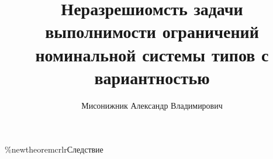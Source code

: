 
\title{Неразрешиомсть задачи выполнимости ограничений номинальной системы типов с вариантностью}

\author{Мисонижник Александр Владимирович}





\theoremstyle{plain}
\%newtheorem{crlr}{Следствие}%

\theoremstyle{definition}
\newtheorem*{proof*}{Доказательство}

\renewcommand{\defnautorefname}{Definition}
\renewcommand{\lemautorefname}{Lemma}
\renewcommand{\remkautorefname}{Remark}
\renewcommand{\propautorefname}{Proposition}
\renewcommand{\exmpautorefname}{Example}
\renewcommand{\thmautorefname}{Theorem}
\newcommand{\crlrautorefname}{Corollary}
\renewcommand{\sectionautorefname}{Section}
\newcommand{\Listingautorefname}{Listing}
\newcommand{\Figureautorefname}{Figure}

\maketitle














\appendix
